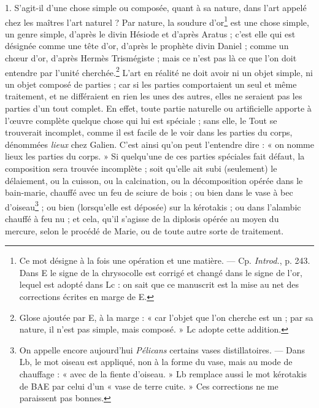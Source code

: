 \documentclass[a4paper, 11pt, oneside, polutonikogreek, french]{article}
\begin{document}
1. S'agit-il d'une chose simple ou composée, quant à sa nature, dans l'art appelé chez les maîtres l'art naturel ? Par nature, la soudure d'or\footnote{Ce mot désigne à la fois une opération et une matière. --- Cp. \emph{Introd.}, p. 243. Dans E le signe de la chrysocolle est corrigé et changé dans le signe de l'or, lequel est adopté dans Lc : on sait que ce manuscrit est la mise au net des corrections écrites en marge de E.} est une chose simple, un genre simple, d'après le divin Hésiode et d'après Aratus ; c'est elle qui est désignée comme une tête d'or, d'après le prophète divin Daniel ; comme un chœur d'or, d'après Hermès Trismégiste ; mais ce n'est pas là ce que l'on doit entendre par l'unité cherchée.\footnote{Glose ajoutée par E, à la marge : « car l'objet que l'on cherche est un ; par sa nature, il n'est pas simple, mais composé. » Lc adopte cette addition.} L'art en réalité ne doit avoir ni un objet simple, ni un objet composé de parties ; car si les parties comportaient un seul et même traitement, et ne différaient en rien les unes des autres, elles ne seraient pas les parties d'un tout complet. En effet, toute partie naturelle ou artificielle apporte à l'œuvre complète quelque chose qui lui est spéciale ; sans elle, le Tout se trouverait incomplet, comme il est facile de le voir dans les parties du corps, dénommées \emph{lieux} chez Galien. C'est ainsi qu'on peut l'entendre dire : « on nomme lieux les parties du corps. » Si quelqu'une de ces parties spéciales fait défaut, la composition sera trouvée incomplète ; soit qu'elle ait subi (seulement) le délaiement, ou la cuisson, ou la calcination, ou la décomposition opérée dans le bain-marie, chauffé avec un feu de sciure de bois ; ou bien dans le vase à bec d'oiseau\footnote{On appelle encore aujourd'hui \emph{Pélicans} certains vases distillatoires. --- Dans Lb, le mot oiseau est appliqué, non à la forme du vase, mais au mode de chauffage : « avec de la fiente d'oiseau. » Lb remplace aussi le mot kérotakis de BAE par celui d'un « vase de terre cuite. » Ces corrections ne me paraissent pas bonnes.} ; ou bien (lorsqu'elle est déposée) sur la kérotakis ; ou dans l'alambic chauffé à feu nu ; et cela, qu'il s'agisse de la diplosis opérée au moyen du mercure, selon le procédé de Marie, ou de toute autre sorte de traitement.
\end{document}
